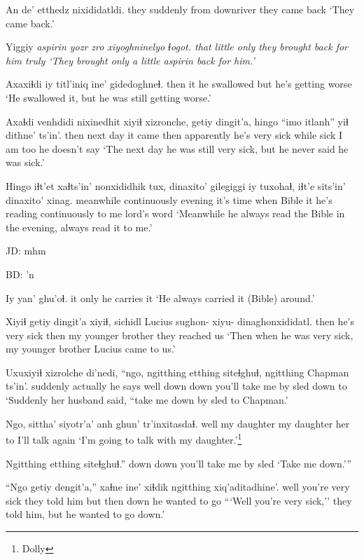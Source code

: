 \documentclass[12pt]{article}
\begin{document}
\gll An de' etthedz nixididatldi.
they suddenly {from downriver}   {they came back}
\glt `They came back.'
\glend

\gll Yiggiy \em{aspirin} yozr zro     xiyoghninelyo ɬogot. 
that   {}     little only {they brought back for him} truly
\glt `They brought only a little aspirin back for him.'
\glend

\gll Axaxiɬdi iy titl'iniq ine' gidedoghneɬ.
then  it  {he swallowed}  but {he's getting worse}
\glt `He swallowed it, but he was still getting worse.'
\glend

\gll Axaɬdi venhdidi nixinedhit xiyiɬ xizronche, {getiy dingit'a,}  hingo ``imo itlanh'' yiɬ {dithne' ts'in'.}
then  {next day} {it came} then       apparently  {he's very sick} while  sick {I am} too {he doesn't say}
\glt `The next day he was still very sick, but he never said he was sick.'
\glend

\gll Hingo iɬt'et xaɬts'in' nonxididhik tux, {dinaxito' gilegiggi} iy tuxohaɬ, iɬt'e sits'in' dinaxito' xinag.
meanwhile continuously evening {it's time} when Bible it  {he's reading} continuously {to me} lord's word
\glt `Meanwhile he always read the Bible in the evening, always read it to me.'
\glend

JD:  mhm

BD:  'n

\gll Iy yan' ghu'oɬ.
it only {he carries it}
\glt `He always carried it (Bible) around.'
\glend

\gll Xiyiɬ {getiy dingit'a} xiyiɬ, sichidl Lucius sughon- xiyu- dinaghonxididatl.
then  {he's very sick} then  {my younger brother} {} {} {}  {they reached us}
\glt `Then when he was very sick, my younger brother Lucius came to us.'
\glend

\gll Uxuxiyiɬ xizrolche di'nedi, ``ngo, ngitthing etthing siteɬghuɬ, ngitthing Chapman ts'in'. 
suddenly  actually      {he says} well down      down    {you'll take me by sled} down {} to
\glt `Suddenly her husband said, ``take me down by sled to Chapman.'
\glend

\gll Ngo, sittha'     siyotr'a'   anh ghun' tr'inxitasdaɬ.
well {my daughter} {my daughter} her to {I'll talk again}
\glt `I'm going to talk with my daughter.'\footnote{Dolly}
\glend

\gll Ngitthing etthing siteɬghuɬ.''
down down {you'll take me by sled}
\glt `Take me down.'''
\glend

\gll ``Ngo {getiy dengit'a,}'' xaɬne ine' xiɬdik        ngitthing xiq'aditadhine'.
well {you're very sick} {they told him} but then down  {he wanted to go}
\glt ```Well you're very sick,'' they told him, but he wanted to go down.'
\glend
\end{document}

